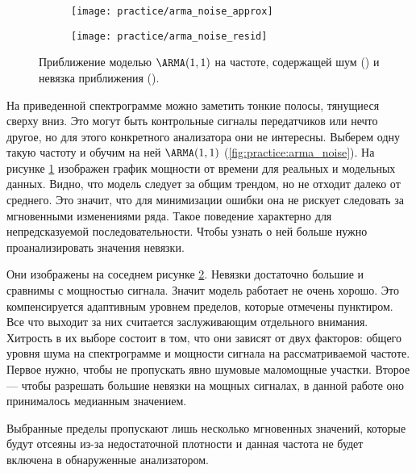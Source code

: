 \begin{figure}[h]
  \centering
  \begin{subfigure}{0.45\textwidth}
    \texttt{[image: practice/arma\_noise\_approx]}
    \caption{}
    \label{fig:practice:arma_noise_approx}
  \end{subfigure}
  \begin{subfigure}{0.45\textwidth}
    \texttt{[image: practice/arma\_noise\_resid]}
    \caption{}
    \label{fig:practice:arma_noise_resid}
  \end{subfigure}
  \caption{Приближение моделью $\ARMA(1,1)$ на частоте, содержащей шум () и невязка приближения ().}
  \label{fig:practice:arma_noise}
\end{figure}

На приведенной спектрограмме можно заметить тонкие полосы, тянущиеся сверху вниз. Это могут быть контрольные сигналы передатчиков или нечто другое, но для этого конкретного анализатора они не интересны. Выберем одну такую частоту и обучим на ней $\ARMA(1,1)$ (\autoref{fig:practice:arma_noise}). На рисунке \ref{fig:practice:arma_noise_approx} изображен график мощности от времени для реальных и модельных данных. Видно, что модель следует за общим трендом, но не отходит далеко от среднего. Это значит, что для минимизации ошибки она не рискует следовать за мгновенными изменениями ряда. Такое поведение характерно для непредсказуемой последовательности. Чтобы узнать о ней больше нужно проанализировать значения невязки.

Они изображены на соседнем рисунке \ref{fig:practice:arma_noise_resid}. Невязки достаточно большие и сравнимы с мощностью сигнала. Значит модель работает не очень хорошо. Это компенсируется адаптивным уровнем пределов, которые отмечены пунктиром. Все что выходит за них считается заслуживающим отдельного внимания. Хитрость в их выборе состоит в том, что они зависят от двух факторов: общего уровня шума на спектрограмме и мощности сигнала на рассматриваемой частоте. Первое нужно, чтобы не пропускать явно шумовые маломощные участки. Второе --- чтобы разрешать большие невязки на мощных сигналах, в данной работе оно принималось медианным значением.

Выбранные пределы пропускают лишь несколько мгновенных значений, которые будут отсеяны из-за недостаточной плотности и данная частота не будет включена в обнаруженные анализатором.

